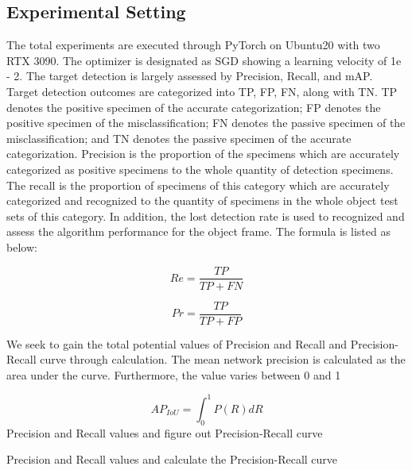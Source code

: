 \documentclass[journal]{IEEEtran}
\begin{document}
\subsection{Experimental Setting}
The total experiments are executed through PyTorch on Ubuntu20 with two RTX 3090. The optimizer is designated as SGD showing a learning velocity of 1e - 2. The target detection is largely assessed by Precision, Recall, and mAP. Target detection outcomes are categorized into TP, FP, FN, along with TN. TP denotes the positive specimen of the accurate categorization; FP denotes the positive specimen of the misclassification; FN denotes the passive specimen of the misclassification; and TN denotes the passive specimen of the accurate categorization. Precision is the proportion of the specimens which are accurately categorized as positive specimens to the whole quantity of detection specimens. The recall is the proportion of specimens of this category which are accurately categorized and recognized to the quantity of specimens in the whole object test sets of this category. In addition, the lost detection rate is used to recognized and assess the algorithm performance for the object frame. The formula is listed as below:

\begin{center} %
\begin{equation}
Re=\frac{TP}{TP + FN}
\end{equation}
\end{center}

\begin{center} %
\begin{equation}
Pr=\frac{TP}{TP + FP}
\end{equation}
\end{center}
We seek to gain the total potential values of Precision and Recall and Precision-Recall curve through calculation. The mean network precision is calculated as the area under the curve. Furthermore, the value varies between 0 and 1


\begin{center} %
\begin{equation}
AP_{IoU}= \int_{0}^{1} P(R) dR
\end{equation}Precision and Recall values and figure out Precision-Recall curve
\end{center}
Precision and Recall values and calculate the Precision-Recall curve
\end{document}
